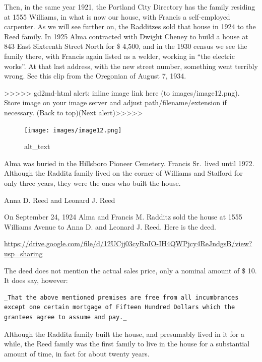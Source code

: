 \documentclass[
  12pt,
]{book}
\begin{document}
Then, in the same year 1921, the Portland City Directory has the family residing at 1555 Williams, in what is now our house, with Francis a self-employed carpenter. As we will see further on, the Radditzes sold that house in 1924 to the Reed family. In 1925 Alma contracted with Dwight Cheney to build a house at 843 East Sixteenth Street North for \$ 4,500, and in the 1930 census we see the family there, with Francis again listed as a welder, working in ``the electric works''. At that last address, with the new street number, something went terribly wrong. See this clip from the Oregonian of August 7, 1934.

{\textgreater\textgreater\textgreater\textgreater\textgreater{} gd2md-html alert: inline image link here (to images/image12.png). Store image on your image server and adjust path/filename/extension if necessary. }(Back to top)(Next alert){\textgreater\textgreater\textgreater\textgreater\textgreater{} }

\begin{figure}
\centering
\texttt{[image: images/image12.png]}
\caption{alt\_text}
\end{figure}

Alma was buried in the Hillsboro Pioneer Cemetery. Francis Sr.~lived until 1972. Although the Radditz family lived on the corner of Williams and Stafford for only three years, they were the ones who built the house.

Anna D. Reed and Leonard J. Reed

On September 24, 1924 Alma and Francis M. Radditz sold the house at 1555 Williams Avenue to Anna D. and Leonard J. Reed. Here is the deed.

\url{https://drive.google.com/file/d/12UCjj03cyRnIO-IH4QWPjcy4ReJndgsB/view?usp=sharing}

The deed does not mention the actual sales price, only a nominal amount of \$ 10. It does say, however:

\begin{verbatim}
_That the above mentioned premises are free from all incumbrances except one certain mortgage of Fifteen Hundred Dollars which the grantees agree to assume and pay._
\end{verbatim}

Although the Radditz family built the house, and presumably lived in it for a while, the Reed family was the first family to live in the house for a substantial amount of time, in fact for about twenty years.
\end{document}
